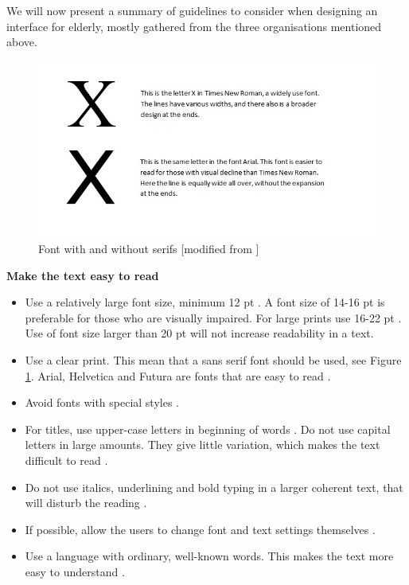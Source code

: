 We will now present a summary of guidelines to consider when designing an interface for elderly, mostly gathered from the three organisations mentioned above.

\begin{figure} [ht!]
\centering
\includegraphics[scale=0.9]{fontExample.jpg}
\caption[Fonts]{Font with and without serifs [modified from \cite{blindeforbundetTekst}]}
\label{fig:fonts}
\end{figure}

\textbf{Make the text easy to read}
\begin{itemize} 
\item Use a relatively large font size, minimum 12 pt \cite{blindeforbundetTekst} \cite{evengrounds}. A font size of 14-16 pt is preferable for those who are visually impaired. For large prints use 16-22 pt \cite{actionforblindpeopleTekst}. Use of font size larger than 20 pt will not increase readability in a text.     
\item Use a clear print. This mean that a sans serif font should be used, see Figure \ref{fig:fonts}. Arial, Helvetica and Futura are fonts that are easy to read \cite{actionforblindpeopleTekst}.
\item Avoid fonts with special styles \cite{blindeforbundetTekst} \cite{actionforblindpeopleTekst}.
\item For titles, use upper-case letters in beginning of words \cite{actionforblindpeopleTekst}. Do not use capital letters in large amounts. They give little variation, which makes the text difficult to read \cite{blindeforbundetTekst}. 
\item Do not use italics, underlining and bold typing in a larger coherent text, that will disturb the reading \cite{blindeforbundetTekst} \cite{actionforblindpeopleTekst}.  
\item If possible, allow the users to change font and text settings themselves \cite{blindeforbundetTekst} \cite{w3cTekst}. 
\item Use a language with ordinary, well-known words. This makes the text more easy to understand \cite{w3cTekst}. \\ 
\end{itemize}

